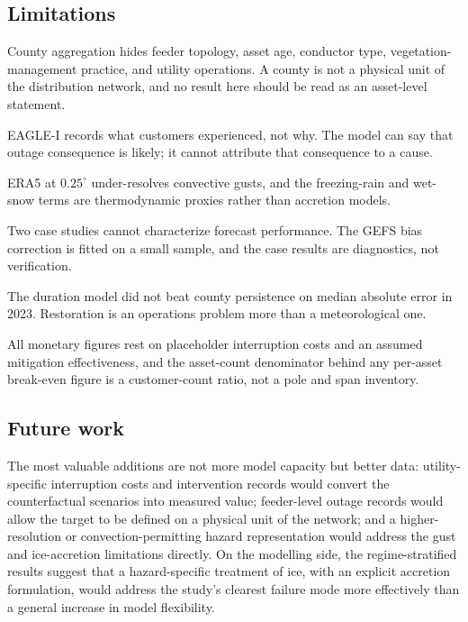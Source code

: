 \documentclass[10pt,twocolumn,letterpaper]{article}
\begin{document}
\subsection{Limitations}

\begin{description}[leftmargin=1.1em,itemsep=0.25em,topsep=0.3em]
\item[\textnormal{\emph{Spatial support of the target.}}] County aggregation
hides feeder topology, asset age, conductor type, vegetation-management
practice, and utility operations. A county is not a physical unit of the
distribution network, and no result here should be read as an asset-level
statement.

\item[\textnormal{\emph{Consequence without mechanism.}}] EAGLE-I records what
customers experienced, not why. The model can say that outage consequence is
likely; it cannot attribute that consequence to a cause.

\item[\textnormal{\emph{Hazard resolution.}}] ERA5 at $0.25^\circ$ under-resolves
convective gusts, and the freezing-rain and wet-snow terms are thermodynamic
proxies rather than accretion models.

\item[\textnormal{\emph{Case-study sample size.}}] Two case studies cannot
characterize forecast performance. The GEFS bias correction is fitted on a small
sample, and the case results are diagnostics, not verification.

\item[\textnormal{\emph{Restoration.}}] The duration model did not beat county
persistence on median absolute error in 2023. Restoration is an operations
problem more than a meteorological one.

\item[\textnormal{\emph{Economics.}}] All monetary figures rest on placeholder
interruption costs and an assumed mitigation effectiveness, and the asset-count
denominator behind any per-asset break-even figure is a customer-count ratio,
not a pole and span inventory.
\end{description}

\subsection{Future work}

The most valuable additions are not more model capacity but better data:
utility-specific interruption costs and intervention records would convert the
counterfactual scenarios into measured value; feeder-level outage records would
allow the target to be defined on a physical unit of the network; and a
higher-resolution or convection-permitting hazard representation would address
the gust and ice-accretion limitations directly. On the modelling side, the
regime-stratified results suggest that a hazard-specific treatment of ice, with
an explicit accretion formulation, would address the study's clearest failure
mode more effectively than a general increase in model flexibility.
\end{document}
